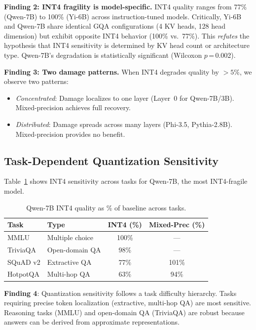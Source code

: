 \documentclass[conference]{IEEEtran}
\begin{document}
\textbf{Finding 2: INT4 fragility is model-specific.}
INT4 quality ranges from 77\% (Qwen-7B) to 100\% (Yi-6B) across instruction-tuned models.
Critically, Yi-6B and Qwen-7B share identical GQA configurations (4 KV heads, 128 head dimension) but exhibit opposite INT4 behavior (100\% vs.\ 77\%).
This \emph{refutes} the hypothesis that INT4 sensitivity is determined by KV head count or architecture type.
Qwen-7B's degradation is statistically significant (Wilcoxon $p$\,=\,0.002).

\textbf{Finding 3: Two damage patterns.}
When INT4 degrades quality by ${>}5\%$, we observe two patterns:
\begin{itemize}
    \item \emph{Concentrated}: Damage localizes to one layer (Layer~0 for Qwen-7B/3B). Mixed-precision achieves full recovery.
    \item \emph{Distributed}: Damage spreads across many layers (Phi-3.5, Pythia-2.8B). Mixed-precision provides no benefit.
\end{itemize}

\subsection{Task-Dependent Quantization Sensitivity}

Table~\ref{tab:task_quant} shows INT4 sensitivity across tasks for Qwen-7B, the most INT4-fragile model.

\begin{table}[t]
\centering
\caption{Qwen-7B INT4 quality as \% of baseline across tasks.}
\label{tab:task_quant}
\small
\begin{tabular}{@{}llcc@{}}
\toprule
\textbf{Task} & \textbf{Type} & \textbf{INT4 (\%)} & \textbf{Mixed-Prec (\%)} \\
\midrule
MMLU      & Multiple choice & 100\%  & ---  \\
TriviaQA  & Open-domain QA  & 98\%   & --- \\
SQuAD v2  & Extractive QA   & 77\%   & 101\% \\
HotpotQA  & Multi-hop QA    & 63\%   & 94\% \\
\bottomrule
\end{tabular}
\end{table}

\textbf{Finding 4}: Quantization sensitivity follows a task difficulty hierarchy.
Tasks requiring precise token localization (extractive, multi-hop QA) are most sensitive.
Reasoning tasks (MMLU) and open-domain QA (TriviaQA) are robust because answers can be derived from approximate representations.
\end{document}
